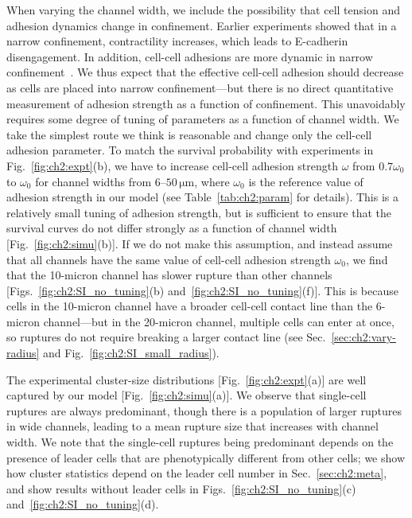 When varying the channel width, we include the possibility that cell tension and adhesion dynamics change in confinement.
Earlier experiments showed that in a narrow confinement, contractility increases, which leads to E-cadherin disengagement.
In addition, cell-cell adhesions are more dynamic in narrow confinement~\cite{law2023cytokinesis, wisniewski2020dorsoventral, ilina2020cell}.
We thus expect that the effective cell-cell adhesion should decrease as cells are placed into narrow confinement---but there is no direct quantitative measurement of adhesion strength as a function of confinement.
This unavoidably requires some degree of tuning of parameters as a function of channel width.
We take the simplest route we think is reasonable and change only the cell-cell adhesion parameter.
To match the survival probability with experiments in Fig.~\ref{fig:ch2:expt}(b), we have to increase cell-cell adhesion strength $\omega$ from $0.7\omega_0$ to $\omega_0$ for channel widths from $6\textrm{--}50\,\mathrm{\mu m}$, where $\omega_0$ is the reference value of adhesion strength in our model (see Table~\ref{tab:ch2:param} for details).
This is a relatively small tuning of adhesion strength, but is sufficient to ensure that the survival curves do not differ strongly as a function of channel width [Fig.~\ref{fig:ch2:simu}(b)].
If we do not make this assumption, and instead assume that all channels have the same value of cell-cell adhesion strength $\omega_0$, we find that the 10-micron channel has slower rupture than other channels [Figs.~\ref{fig:ch2:SI_no_tuning}(b) and~\ref{fig:ch2:SI_no_tuning}(f)].
This is because cells in the 10-micron channel have a broader cell-cell contact line than the 6-micron channel---but in the 20-micron channel, multiple cells can enter at once, so ruptures do not require breaking a larger contact line (see Sec.~\ref{sec:ch2:vary-radius} and Fig.~\ref{fig:ch2:SI_small_radius}).

The experimental cluster-size distributions [Fig.~\ref{fig:ch2:expt}(a)] are well captured by our model [Fig.~\ref{fig:ch2:simu}(a)].
We observe that single-cell ruptures are always predominant, though there is a population of larger ruptures in wide channels, leading to a mean rupture size that increases with channel width.
We note that the single-cell ruptures being predominant depends on the presence of leader cells that are phenotypically different from other cells; we show how cluster statistics depend on the leader cell number in Sec.~\ref{sec:ch2:meta}, and show results without leader cells in Figs.~\ref{fig:ch2:SI_no_tuning}(c) and~\ref{fig:ch2:SI_no_tuning}(d).

